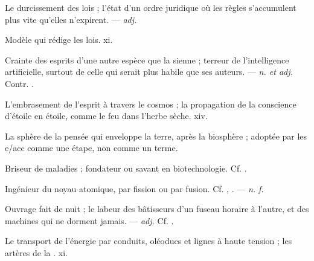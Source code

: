  Le durcissement des lois ; l'état d'un ordre juridique où les règles s'accumulent plus vite qu'elles n'expirent. ---  \textit{adj.}

 Modèle qui rédige les lois.   xi.

 Crainte des esprits d'une autre espèce que la sienne ; terreur de l'intelligence artificielle, surtout de celle qui serait plus habile que ses auteurs. ---  \textit{n. et adj.} Contr. .

 L'embrasement de l'esprit à travers le cosmos ; la propagation de la conscience d'étoile en étoile, comme le feu dans l'herbe sèche.   xiv.

 La sphère de la pensée qui enveloppe la terre, après la biosphère ; adoptée par les e/acc comme une étape, non comme un terme.

 Briseur de maladies ; fondateur ou savant en biotechnologie. Cf. .

 Ingénieur du noyau atomique, par fission ou par fusion. Cf. , . ---  \textit{n. f.}

 Ouvrage fait de nuit ; le labeur des bâtisseurs d'un fuseau horaire à l'autre, et des machines qui ne dorment jamais. ---  \textit{adj.} Cf. .

 Le transport de l'énergie par conduits, oléoducs et lignes à haute tension ; les artères de la .   xi.


